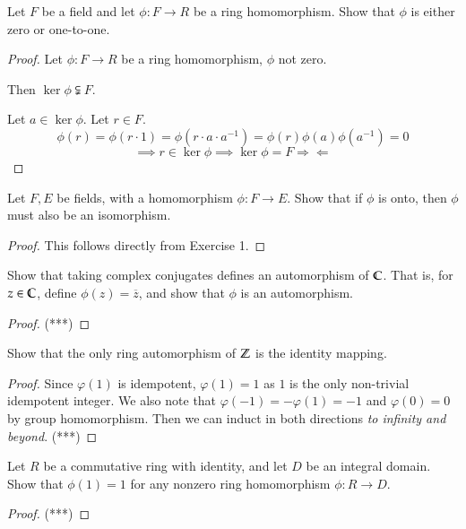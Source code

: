 \exercise Let $F$ be a field and let $\phi:F\to R$ be a ring homomorphism. Show that $\phi$ is either zero or one-to-one. 
\begin{proof}
	Let $\phi:F\to R$ be a ring homomorphism, $\phi$ not zero. 
	
	Then $\ker\phi\subsetneqq F$. 
	
	Let $a\in \ker \phi$. Let $r\in F$. 
	\[\phi(r) = \phi(r \cdot 1) = \phi(r\cdot a\cdot a^{-1}) = \phi(r)\phi(a)\phi(a^{-1}) = 0\]
	\[\implies r\in \ker\phi\implies \ker\phi = F \Rightarrow\!\Leftarrow\]
\end{proof}

\exercise Let $F, E$ be fields, with a homomorphism $\phi: F\to E$. Show that if $\phi$ is onto, then $\phi$ must also be an isomorphism. 

\begin{proof}
	This follows directly from Exercise 1. 
\end{proof}


\exercise Show that taking complex conjugates defines an automorphism of $\mathbb{C}$. That is, for $z\in \mathbb{C}$, define $\phi(z) = \overline{z}$, and show that $\phi$ is an automorphism. 
\begin{proof}
	(***)
\end{proof}

\exercise Show that the only ring automorphism of $\mathbb{Z}$ is the identity mapping. 
\begin{proof}
	Since $\varphi(1)$ is idempotent, $\varphi(1) = 1$ as $1$ is the only non-trivial idempotent integer. We also note that $\varphi(-1) = -\varphi(1) = -1$ and $\varphi(0) = 0$ by group homomorphism. Then we can induct in both directions \textit{to infinity and beyond}. (***)
\end{proof}

\exercise Let $R$ be a commutative ring with identity, and let $D$ be an integral domain. Show that $\phi(1) = 1$ for any nonzero ring homomorphism $\phi:R\to D$. 
\begin{proof}
	(***)
\end{proof}

